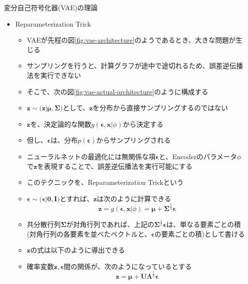 \documentclass[dvipdfmx,notheorems,t]{beamer}
\begin{document}
\begin{frame}{変分自己符号化器(VAE)の理論}

\begin{itemize}
	\item Reparameterization Trick
	\begin{itemize}
		\item VAEが先程の図\ref{fig:vae-architecture}のようであるとき、\alert{大きな問題が生じる}
		\item サンプリングを行うと、計算グラフが途中で途切れるため、\alert{誤差逆伝播法を実行できない}
		\newline
		
		\item そこで、次の図\ref{fig:vae-actual-architecture}のように構成する
		\item $\bm{z} \sim \mathcal(\bm{z} | \bm{\mu}, \bm{\Sigma})$として、$\bm{z}$を分布から直接サンプリングするのではない
		\item $\bm{z}$を、\alert{決定論的な関数}$g(\bm{\epsilon}, \bm{x} | \phi)$から決定する
		\item 但し、$\bm{\epsilon}$は、分布$p(\bm{\epsilon})$からサンプリングされる
		\newline
		
		\item ニューラルネットの最適化には無関係な項$\bm{\epsilon}$と、Encoderのパラメータ$\phi$で$\bm{z}$を表現することで、誤差逆伝播法を実行可能にする
		\item このテクニックを、\alert{Reparameterization Trick}という
		\newline
		
		\item $\bm{\epsilon} \sim \mathcal(\bm{\epsilon} | \bm{0}, \bm{I})$とすれば、$\bm{z}$は次のように計算できる
		\begin{equation}
			\bm{z} = g(\bm{\epsilon}, \bm{x} | \phi) = \bm{\mu} + \bm{\Sigma}^\frac{1}{2} \bm{\epsilon}
		\end{equation}
		
		\item 共分散行列$\bm{\Sigma}$が対角行列であれば、上記の$\bm{\Sigma}^\frac{1}{2} \bm{\epsilon}$は、単なる要素ごとの積(対角行列の各要素を並べたベクトルと、$\bm{\epsilon}$の要素ごとの積)として書ける
		\newline
		
		\item $\bm{z}$の式は以下のように導出できる
		\newline
		
		\item 確率変数$\bm{z}, \bm{\epsilon}$間の関係が、次のようになっているとする
		\begin{equation}
			\bm{z} = \bm{\mu} + \bm{U} \bm{\Lambda}^\frac{1}{2} \bm{\epsilon}
		\end{equation}
		

\end{itemize}
\end{itemize}
\end{frame}
\end{document}
